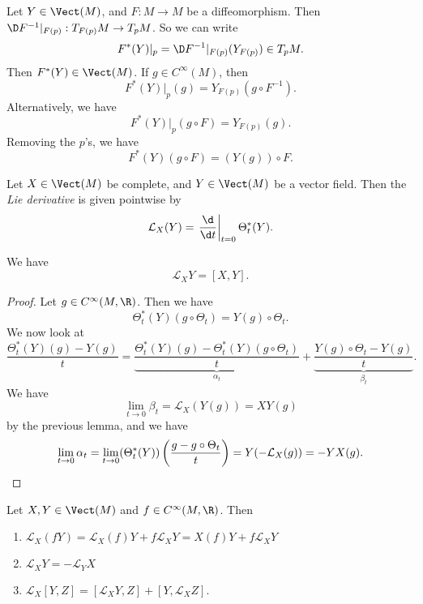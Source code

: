 \documentclass[a4paper]{article}
\begin{document}
\begin{notation}
  Let $Y \in \Vect(M)$, and $F: M \to M$ be a diffeomorphism. Then $\D F^{-1}|_{F(p)}: T_{F(p)} M \to T_pM$. So we can write
  \[
    F^*(Y)|_p = \D F^{-1}|_{F(p)}(Y_{F(p)}) \in T_p M.
  \]
  Then $F^*(Y) \in \Vect(M)$. If $g \in C^\infty(M)$, then
  \[
    F^*(Y)|_p(g) = Y_{F(p)} (g \circ F^{-1}).
  \]
  Alternatively, we have
  \[
    F^*(Y)|_p(g \circ F) = Y_{F(p)}(g).
  \]
  Removing the $p$'s, we have
  \[
    F^*(Y)(g \circ F) = (Y(g)) \circ F.
  \]
\end{notation}

\begin{defi}
  Let $X \in \Vect(M)$ be complete, and $Y \in \Vect(M)$ be a vector field. Then the \emph{Lie derivative} is given pointwise by
  \[
    \mathcal{L}_X(Y) = \left.\frac{\d}{\d t}\right|_{t = 0} \Theta_t^*(Y).
  \]
\end{defi}

\begin{lemma}
  We have
  \[
    \mathcal{L}_X Y = [X, Y].
  \]
\end{lemma}

\begin{proof}
  Let $g \in C^\infty(M, \R)$. Then we have
  \[
    \Theta_t^*(Y)(g \circ \Theta_t) = Y(g) \circ \Theta_t.
  \]
  We now look at
  \[
    \frac{\Theta_t^* (Y)(g) - Y(g)}{t} = \underbrace{\frac{\Theta_t^*(Y)(g) - \Theta_t^*(Y)(g \circ \Theta_t)}{t}}_{\alpha_t} + \underbrace{\frac{Y(g) \circ \Theta_t - Y(g)}{t}}_{\beta_t}.
  \]
  We have
  \[
    \lim_{t \to 0} \beta_t = \mathcal{L}_X (Y(g)) = XY(g)
  \]
  by the previous lemma, and we have
  \[
    \lim_{t\to 0}\alpha_t = \lim_{t \to 0} (\Theta_t^*(Y))\left(\frac{g - g \circ \Theta_t}{t}\right) = Y(-\mathcal{L}_X(g)) = - YX(g). \qedhere
  \]
\end{proof}

\begin{cor}
  Let $X, Y \in \Vect(M)$ and $f \in C^\infty(M, \R)$. Then
  \begin{enumerate}
    \item $\mathcal{L}_X(fY) = \mathcal{L}_X(f) Y + f \mathcal{L}_X Y = X(f) Y + f \mathcal{L}_X Y$
    \item $\mathcal{L}_X Y = - \mathcal{L}_Y X$
    \item $\mathcal{L}_X[Y, Z] = [\mathcal{L}_X Y, Z] + [Y, \mathcal{L}_X Z]$.
  \end{enumerate}
\end{cor}
\end{document}
